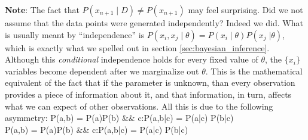 \begin{footnotesize}
{\bf Note}: The fact that $P(x_{n+1}\;|\;D) \neq P(x_{n+1})$ may feel surprising. Did we not assume that the data points were generated independently? Indeed we did. What is usually meant by ``independence'' is $P(x_i, x_j\;|\;\theta) = P(x_i\;|\;\theta) P(x_j\;|\theta)$, which is exactly what we spelled out in section \ref{sec:bayesian_inference}. Although this \emph{conditional} independence holds for every fixed value of $\theta$, the $\{x_i\}$ variables become dependent after we marginalize out $\theta$. This is the mathematical equivalent of the fact that if the parameter is unknown, than every observation provides a piece of information about it, and that information, in turn, affects what we can expect of other observations. All this is due to the following asymmetry:
\ba
	P(a,b) = P(a)P(b) &\quad \Rightarrow \quad& \forall c:\;P(a,b\;|\;c) = P(a\;|\;c) P(b\;|\;c) \\
	P(a,b) = P(a)P(b) &\quad \not\!\Leftarrow \quad& \forall c:\;P(a,b\;|\;c) = P(a\;|\;c) P(b\;|\;c)
\ea
\end{footnotesize}

\newpage
{}

